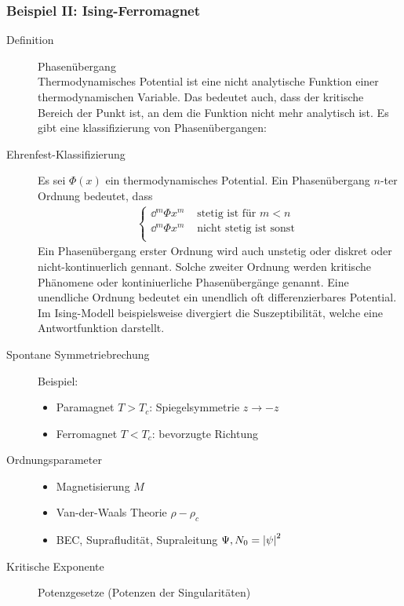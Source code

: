 \subsubsection*{Beispiel II: Ising-Ferromagnet}
\begin{description}
  \item[Definition] Phasenübergang \\
    Thermodynamisches Potential ist eine nicht analytische Funktion einer
    thermodynamischen Variable. Das bedeutet auch, dass der kritische Bereich
    der Punkt ist, an dem die Funktion nicht mehr analytisch ist. Es gibt eine
    klassifizierung von Phasenübergangen:
  \item[Ehrenfest-Klassifizierung] Es sei $\Phi(x)$ ein thermodynamisches Potential.
    Ein Phasenübergang $n$-ter Ordnung bedeutet, dass %
    \begin{align*}
      \begin{cases}
        \dd{^m \Phi}{x^m} & \text{ stetig ist für } m < n \\
        \dd{^m \Phi}{x^m} & \text{ nicht stetig ist sonst } \\
      \end{cases}
    \end{align*}
    Ein Phasenübergang erster Ordnung wird auch unstetig oder diskret oder nicht-kontinuerlich gennant.
    Solche zweiter Ordnung werden kritische Phänomene oder kontiniuerliche Phasenübergänge
    genannt. Eine unendliche Ordnung bedeutet ein unendlich oft differenzierbares
    Potential. Im Ising-Modell beispielsweise divergiert die Suszeptibilität,
    welche eine Antwortfunktion darstellt.
  \item[Spontane Symmetriebrechung] $ $ \\
    Beispiel:
    \begin{itemize}
      \item Paramagnet $T > T_c$: Spiegelsymmetrie $ z \to -z$
      \item Ferromagnet $T < T_c$: bevorzugte Richtung
    \end{itemize}
  \item[Ordnungsparameter]
    \begin{itemize}
      \item Magnetisierung $M$
      \item Van-der-Waals Theorie $\rho- \rho_c$
      \item BEC, Suprafludität, Supraleitung $\Psi, N_0 = \left| \psi \right|^2$
    \end{itemize}
  \item[Kritische Exponente] Potenzgesetze (Potenzen der Singularitäten) \\

\end{description}

